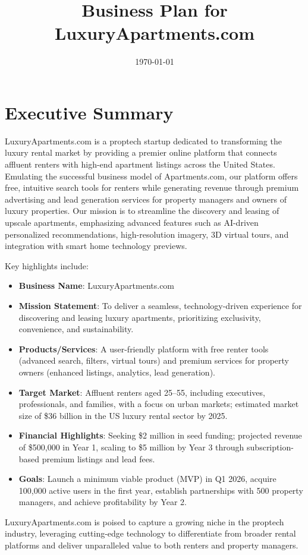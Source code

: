 \documentclass[12pt]{article}
\title{\textbf{Business Plan for LuxuryApartments.com}}
\author{}
\date{\today}
\begin{document}
\maketitle
\tableofcontents
\newpage

\section{Executive Summary}
LuxuryApartments.com is a proptech startup dedicated to transforming the luxury rental market by providing a premier online platform that connects affluent renters with high-end apartment listings across the United States. Emulating the successful business model of Apartments.com, our platform offers free, intuitive search tools for renters while generating revenue through premium advertising and lead generation services for property managers and owners of luxury properties. Our mission is to streamline the discovery and leasing of upscale apartments, emphasizing advanced features such as AI-driven personalized recommendations, high-resolution imagery, 3D virtual tours, and integration with smart home technology previews.

Key highlights include:
\begin{itemize}
    \item \textbf{Business Name}: LuxuryApartments.com
    \item \textbf{Mission Statement}: To deliver a seamless, technology-driven experience for discovering and leasing luxury apartments, prioritizing exclusivity, convenience, and sustainability.
    \item \textbf{Products/Services}: A user-friendly platform with free renter tools (advanced search, filters, virtual tours) and premium services for property owners (enhanced listings, analytics, lead generation).
    \item \textbf{Target Market}: Affluent renters aged 25--55, including executives, professionals, and families, with a focus on urban markets; estimated market size of \$36 billion in the US luxury rental sector by 2025.
    \item \textbf{Financial Highlights}: Seeking \$2 million in seed funding; projected revenue of \$500,000 in Year 1, scaling to \$5 million by Year 3 through subscription-based premium listings and lead fees.
    \item \textbf{Goals}: Launch a minimum viable product (MVP) in Q1 2026, acquire 100,000 active users in the first year, establish partnerships with 500 property managers, and achieve profitability by Year 2.
\end{itemize}
LuxuryApartments.com is poised to capture a growing niche in the proptech industry, leveraging cutting-edge technology to differentiate from broader rental platforms and deliver unparalleled value to both renters and property managers.
\end{document}

